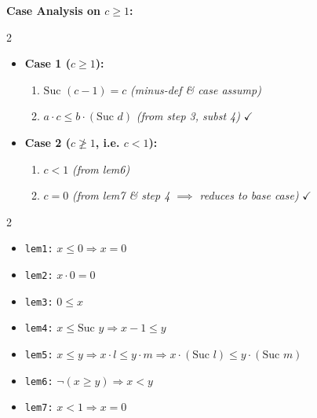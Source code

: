\documentclass[10pt,a4paper]{article}
\begin{document}
\begin{tcolorbox}[title={2. Worked Example: Proving $a \le b \Longrightarrow c \le d \Longrightarrow a \cdot c \le b \cdot d$}]
\vspace{0.2em}
\textbf{Case Analysis on $c \ge 1$:}
\begin{multicols}{2}
\begin{itemize}[leftmargin=1.2em, itemsep=2pt]
    \item \textbf{Case 1 ($c \ge 1$):}
    \begin{enumerate}[leftmargin=1.2em, itemsep=1pt]
        \item $\text{Suc }(c - 1) = c$ \quad \textit{(minus-def \& case assump)}
        \item $a \cdot c \le b \cdot (\text{Suc } d)$ \quad \textit{(from step 3, subst 4)} $\checkmark$
    \end{enumerate}
\end{itemize}

\columnbreak

\begin{itemize}[leftmargin=1.2em, itemsep=2pt]
    \item \textbf{Case 2 ($c \ngeq 1$, i.e. $c < 1$):}
    \begin{enumerate}[leftmargin=1.2em, itemsep=1pt]
        \item $c < 1$ \quad \textit{(from lem6)}
        \item $c = 0$ \quad \textit{(from lem7 \& step 4 $\implies$ reduces to base case)} $\checkmark$
    \end{enumerate}
\end{itemize}
\end{multicols}
\end{tcolorbox}

\vspace{0.3em}

\begin{tcolorbox}[title={Auxiliary Lemmas Used in Proof}]
\begin{multicols}{2}
\begin{itemize}[leftmargin=1.2em, itemsep=2pt]
    \item \texttt{lem1:} $x \le 0 \Longrightarrow x = 0$
    \item \texttt{lem2:} $x \cdot 0 = 0$
    \item \texttt{lem3:} $0 \le x$
    \item \texttt{lem4:} $x \le \text{Suc } y \Longrightarrow x - 1 \le y$
\end{itemize}

\columnbreak

\begin{itemize}[leftmargin=1.2em, itemsep=2pt]
    \item \texttt{lem5:} $x \le y \Longrightarrow x \cdot l \le y \cdot m \Longrightarrow x \cdot (\text{Suc } l) \le y \cdot (\text{Suc } m)$
    \item \texttt{lem6:} $\neg (x \ge y) \Longrightarrow x < y$
    \item \texttt{lem7:} $x < 1 \Longrightarrow x = 0$
\end{itemize}
\end{multicols}
\end{tcolorbox}
\end{document}

